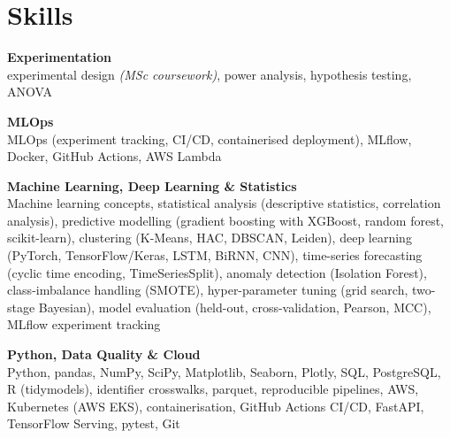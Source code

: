 \documentclass[a4paper,11pt]{article}
\newcommand{\skillgroup}[2]{{\color{headernavy}\textbf{#1}}\\ #2\par\vspace{3pt}}
\begin{document}
\section{Skills}
\skillgroup{Experimentation}{experimental design \textit{(MSc coursework)}, power analysis, hypothesis testing, ANOVA}
\skillgroup{MLOps}{MLOps (experiment tracking, CI/CD, containerised deployment), MLflow, Docker, GitHub Actions, AWS Lambda}
\skillgroup{Machine Learning, Deep Learning \& Statistics}{Machine learning concepts, statistical analysis (descriptive statistics, correlation analysis), predictive modelling (gradient boosting with XGBoost, random forest, scikit-learn), clustering (K-Means, HAC, DBSCAN, Leiden), deep learning (PyTorch, TensorFlow/Keras, LSTM, BiRNN, CNN), time-series forecasting (cyclic time encoding, TimeSeriesSplit), anomaly detection (Isolation Forest), class-imbalance handling (SMOTE), hyper-parameter tuning (grid search, two-stage Bayesian), model evaluation (held-out, cross-validation, Pearson, MCC), MLflow experiment tracking}
\skillgroup{Python, Data Quality \& Cloud}{Python, pandas, NumPy, SciPy, Matplotlib, Seaborn, Plotly, SQL, PostgreSQL, R (tidymodels), identifier crosswalks, parquet, reproducible pipelines, AWS, Kubernetes (AWS EKS), containerisation, GitHub Actions CI/CD, FastAPI, TensorFlow Serving, pytest, Git}
\end{document}
